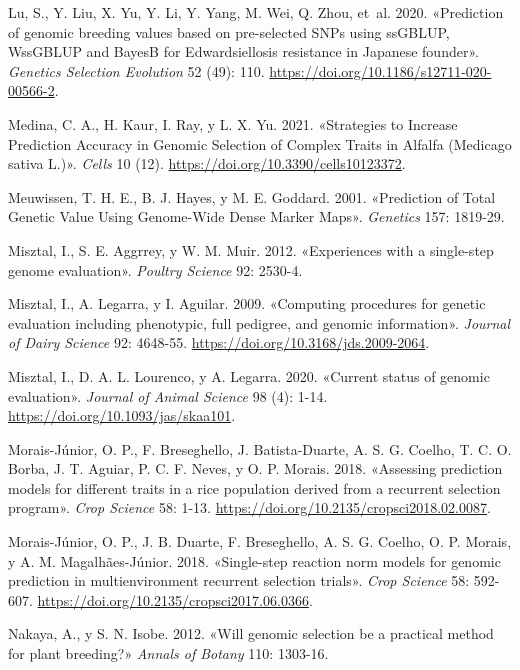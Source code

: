 \documentclass[11pt,spanish,a4paper,oneside,]{book} %
\begin{document}
\leavevmode\hypertarget{ref-cite:80}{}%
Lu, S., Y. Liu, X. Yu, Y. Li, Y. Yang, M. Wei, Q. Zhou, et~al. 2020. «Prediction of genomic breeding values based on pre-selected SNPs using ssGBLUP, WssGBLUP and BayesB for Edwardsiellosis resistance in Japanese founder». \emph{Genetics Selection Evolution} 52 (49): 110. \url{https://doi.org/10.1186/s12711-020-00566-2}.

\leavevmode\hypertarget{ref-cite:38}{}%
Medina, C. A., H. Kaur, I. Ray, y L. X. Yu. 2021. «Strategies to Increase Prediction Accuracy in Genomic Selection of Complex Traits in Alfalfa (Medicago sativa L.)». \emph{Cells} 10 (12). \url{https://doi.org/10.3390/cells10123372}.

\leavevmode\hypertarget{ref-cite:8}{}%
Meuwissen, T. H. E., B. J. Hayes, y M. E. Goddard. 2001. «Prediction of Total Genetic Value Using Genome-Wide Dense Marker Maps». \emph{Genetics} 157: 1819-29.

\leavevmode\hypertarget{ref-cite:14}{}%
Misztal, I., S. E. Aggrrey, y W. M. Muir. 2012. «Experiences with a single-step genome evaluation». \emph{Poultry Science} 92: 2530-4.

\leavevmode\hypertarget{ref-cite:16}{}%
Misztal, I., A. Legarra, y I. Aguilar. 2009. «Computing procedures for genetic evaluation including phenotypic, full pedigree, and genomic information». \emph{Journal of Dairy Science} 92: 4648-55. \url{https://doi.org/10.3168/jds.2009-2064}.

\leavevmode\hypertarget{ref-cite:18}{}%
Misztal, I., D. A. L. Lourenco, y A. Legarra. 2020. «Current status of genomic evaluation». \emph{Journal of Animal Science} 98 (4): 1-14. \url{https://doi.org/10.1093/jas/skaa101}.

\leavevmode\hypertarget{ref-cite:68}{}%
Morais-Júnior, O. P., F. Breseghello, J. Batista-Duarte, A. S. G. Coelho, T. C. O. Borba, J. T. Aguiar, P. C. F. Neves, y O. P. Morais. 2018. «Assessing prediction models for different traits in a rice population derived from a recurrent selection program». \emph{Crop Science} 58: 1-13. \url{https://doi.org/10.2135/cropsci2018.02.0087}.

\leavevmode\hypertarget{ref-cite:69}{}%
Morais-Júnior, O. P., J. B. Duarte, F. Breseghello, A. S. G. Coelho, O. P. Morais, y A. M. Magalhães-Júnior. 2018. «Single-step reaction norm models for genomic prediction in multienvironment recurrent selection trials». \emph{Crop Science} 58: 592-607. \url{https://doi.org/10.2135/cropsci2017.06.0366}.

\leavevmode\hypertarget{ref-cite:6}{}%
Nakaya, A., y S. N. Isobe. 2012. «Will genomic selection be a practical method for plant breeding?» \emph{Annals of Botany} 110: 1303-16.
\end{document}
